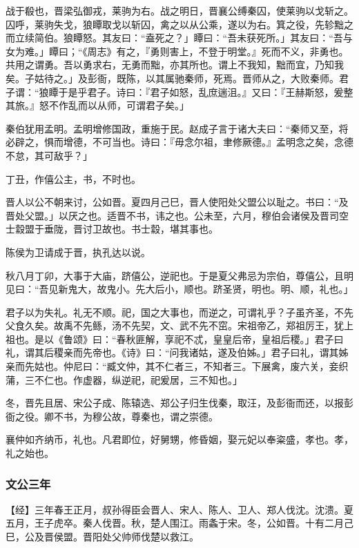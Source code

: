 \documentclass[]{article}
\begin{document}
战于殽也，晋梁弘御戎，莱驹为右。战之明日，晋襄公缚秦囚，使莱驹以戈斩之。囚呼，莱驹失戈，狼瞫取戈以斩囚，禽之以从公乘，遂以为右。箕之役，先轸黜之而立续简伯。狼瞫怒。其友曰：``盍死之？」瞫曰：``吾未获死所。」其友曰：``吾与女为难。」瞫曰；``《周志》有之，『勇则害上，不登于明堂。』死而不义，非勇也。共用之谓勇。吾以勇求右，无勇而黜，亦其所也。谓上不我知，黜而宜，乃知我矣。子姑待之。」及彭衙，既陈，以其属驰秦师，死焉。晋师从之，大败秦师。君子谓：``狼瞫于是乎君子。诗曰：『君子如怒，乱庶遄沮。』又曰：『王赫斯怒，爰整其旅。』怒不作乱而以从师，可谓君子矣。」

秦伯犹用孟明。孟明增修国政，重施于民。赵成子言于诸大夫曰：``秦师又至，将必辟之，惧而增德，不可当也。诗曰：『毋念尔祖，聿修厥德。』孟明念之矣，念德不怠，其可敌乎？」

丁丑，作僖公主，书，不时也。

晋人以公不朝来讨，公如晋。夏四月己巳，晋人使阳处父盟公以耻之。书曰：``及晋处父盟。」以厌之也。适晋不书，讳之也。公未至，六月，穆伯会诸侯及晋司空士縠盟于垂陇，晋讨卫故也。书士縠，堪其事也。

陈侯为卫请成于晋，执孔达以说。

秋八月丁卯，大事于大庙，跻僖公，逆祀也。于是夏父弗忌为宗伯，尊僖公，且明见曰：``吾见新鬼大，故鬼小。先大后小，顺也。跻圣贤，明也。明、顺，礼也。」

君子以为失礼。礼无不顺。祀，国之大事也，而逆之，可谓礼乎？子虽齐圣，不先父食久矣。故禹不先鲧，汤不先契，文、武不先不窋。宋祖帝乙，郑祖厉王，犹上祖也。是以《鲁颂》曰：``春秋匪解，享祀不忒，皇皇后帝，皇祖后稷。」君子曰礼，谓其后稷亲而先帝也。《诗》曰：``问我诸姑，遂及伯姊。」君子曰礼，谓其姊亲而先姑也。仲尼曰：``臧文仲，其不仁者三，不知者三。下展禽，废六关，妾织蒲，三不仁也。作虚器，纵逆祀，祀爰居，三不知也。」

冬，晋先且居、宋公子成、陈辕选、郑公子归生伐秦，取汪，及彭衙而还，以报彭衙之役。卿不书，为穆公故，尊秦也，谓之崇德。

襄仲如齐纳币，礼也。凡君即位，好舅甥，修昏姻，娶元妃以奉粢盛，孝也。孝，礼之始也。

\hypertarget{header-n1077}{%
\subsubsection{文公三年}\label{header-n1077}}

【经】三年春王正月，叔孙得臣会晋人、宋人、陈人、卫人、郑人伐沈。沈溃。夏五月，王子虎卒。秦人伐晋。秋，楚人围江。雨螽于宋。冬，公如晋。十有二月己巳，公及晋侯盟。晋阳处父帅师伐楚以救江。
\end{document}
